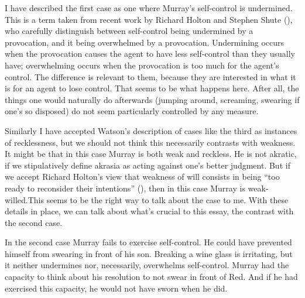 \documentclass[
  11pt,
  letterpaper,
  DIV=11,
  numbers=noendperiod,
  oneside]{scrartcl}
\begin{document}
I have described the first case as one where Murray's self-control is
undermined. This is a term taken from recent work by Richard Holton and
Stephen Shute (), who carefully
distinguish between self-control being undermined by a provocation, and
it being overwhelmed by a provocation. Undermining occurs when the
provocation causes the agent to have less self-control than they usually
have; overwhelming occurs when the provocation is too much for the
agent's control. The difference is relevant to them, because they are
interested in what it is for an agent to lose control. That seems to be
what happens here. After all, the things one would naturally do
afterwards (jumping around, screaming, swearing if one's so disposed) do
not seem particularly controlled by any measure.

Similarly I have accepted Watson's description of cases like the third
as instances of recklessness, but we should not think this necessarily
contrasts with weakness. It might be that in this case Murray is both
weak and reckless. He is not akratic, if we stipulatively define akrasia
as acting against one's better judgment. But if we accept Richard
Holton's view that weakness of will consists in being ``too ready to
reconsider their intentions'' (), then in this case Murray is weak-willed.This seems to be the right way to talk about the
case to me. With these details in place, we can talk about what's
crucial to this essay, the contrast with the second case.

In the second case Murray fails to exercise self-control. He could have
prevented himself from swearing in front of his son. Breaking a wine
glass is irritating, but it neither undermines nor, necessarily,
overwhelms self-control. Murray had the capacity to think about his
resolution to not swear in front of Red. And if he had exercised this
capacity, he would not have sworn when he did.
\end{document}
